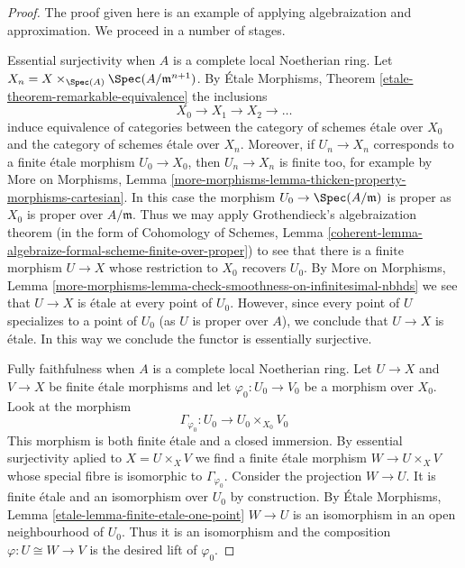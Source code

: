 \begin{proof}
The proof given here is an example of applying algebraization and
approximation. We proceed in a number of stages.

\medskip\noindent
Essential surjectivity when $A$ is a complete local Noetherian ring.
Let $X_n = X \times_{\Spec(A)} \Spec(A/\mathfrak m^{n + 1})$.
By \'Etale Morphisms, Theorem \ref{etale-theorem-remarkable-equivalence}
the inclusions
$$
X_0 \to X_1 \to X_2 \to \ldots
$$
induce equivalence of categories between the category
of schemes \'etale over $X_0$ and the category of schemes
\'etale over $X_n$.
Moreover, if $U_n \to X_n$ corresponds to a finite \'etale
morphism $U_0 \to X_0$, then $U_n \to X_n$ is finite too, for example
by More on Morphisms, Lemma
\ref{more-morphisms-lemma-thicken-property-morphisms-cartesian}.
In this case the morphism $U_0 \to \Spec(A/\mathfrak m)$
is proper as $X_0$ is proper over $A/\mathfrak m$. Thus we may apply
Grothendieck's algebraization theorem
(in the form of
Cohomology of Schemes, Lemma
\ref{coherent-lemma-algebraize-formal-scheme-finite-over-proper})
to see that there is a finite morphism $U \to X$ whose restriction
to $X_0$ recovers $U_0$. By More on Morphisms, Lemma
\ref{more-morphisms-lemma-check-smoothness-on-infinitesimal-nbhds}
we see that $U \to X$ is \'etale at every point of $U_0$.
However, since every point of $U$ specializes to a point of $U_0$
(as $U$ is proper over $A$), we conclude that $U \to X$ is \'etale.
In this way we conclude the functor is essentially surjective.

\medskip\noindent
Fully faithfulness when $A$ is a complete local Noetherian ring.
Let $U \to X$ and $V \to X$ be finite \'etale morphisms and
let $\varphi_0 : U_0 \to V_0$ be a morphism over $X_0$. Look at
the morphism
$$
\Gamma_{\varphi_0} : U_0 \longrightarrow U_0 \times_{X_0} V_0
$$
This morphism is both finite \'etale and a closed immersion.
By essential surjectivity aplied to $X = U \times_X V$ we find
a finite \'etale morphism $W \to U \times_X V$ whose special
fibre is isomorphic to $\Gamma_{\varphi_0}$. Consider the projection
$W \to U$. It is finite \'etale and an isomorphism over $U_0$ by
construction. By \'Etale Morphisms, Lemma
\ref{etale-lemma-finite-etale-one-point}
$W \to U$ is an isomorphism in an open neighbourhood of $U_0$.
Thus it is an isomorphism and the composition $\varphi : U \cong W \to V$
is the desired lift of $\varphi_0$.


\end{proof}
